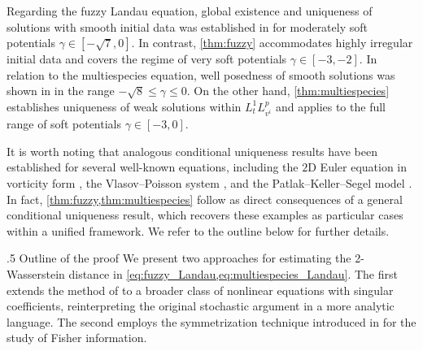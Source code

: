 \documentclass[10pt,oneside]{amsart}
\makeatletter
\def\subsection{\@startsection{subsection}{2}%
  \z@{.5\linespacing\@plus.7\linespacing}
{.5\baselineskip}%
  {\normalfont\centering\scshape}%
}
\numberwithin{equation}{section}
\numberwithin{definition}{section}
\numberwithin{theorem}{section}
\numberwithin{lemma}{section}
\makeatother
\begin{document}
Regarding the fuzzy Landau equation, global existence and uniqueness of solutions with smooth initial data was established in \cite{gualdani2025FuzzyLandauFisher} for moderately soft potentials $\gamma \in [-\sqrt 7,0]$. In contrast, \cref{thm:fuzzy} accommodates highly irregular initial data and covers the regime of very soft potentials $\gamma \in [-3,-2]$. In relation to the multiespecies equation, well posedness of smooth solutions was shown in \cite{JunnWinterYoldas2025multiLandau} in the range $-\sqrt{8} \leq \gamma \leq 0$. On the other hand, \cref{thm:multiespecies} establishes uniqueness of weak solutions within $L^1_t L^p_{v^i}$ and applies to the full range of soft potentials $\gamma \in [-3,0]$.

It is worth noting that analogous conditional uniqueness results have been established for several well-known equations, including the $2$D Euler equation in vorticity form \cite{Yudovich1963Uniqueness}, the Vlasov–Poisson system \cite{Loeper2006UniquenessVlasovPoisson}, and the Patlak–Keller–Segel model \cite{carrillo2012uniquenessKS}. In fact, \cref{thm:fuzzy,thm:multiespecies} follow as direct consequences of a general conditional uniqueness result, which recovers these examples as particular cases within a unified framework. We refer to the outline below for further details.


\subsection{Outline of the proof}
We present two approaches for estimating the 2-Wasserstein distance in \cref{eq:fuzzy_Landau,eq:multiespecies_Landau}. The first extends the method of \cite{fournier2010uniqueness_Coulomb} to a broader class of nonlinear equations with singular coefficients, reinterpreting the original stochastic argument in a more analytic language. The second employs the symmetrization technique introduced in \cite{GS24} for the study of Fisher information.
\end{document}
